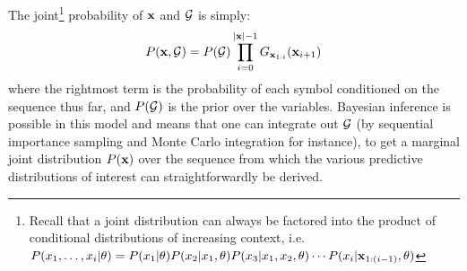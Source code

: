 \documentclass[12pt]{article}
\begin{document}
{{The joint\footnote{Recall that a joint distribution can always be factored into the product of conditional distributions of increasing context, i.e.~$P(x_1,\ldots,x_i|\theta) = P(x_1|\theta) P(x_2 | x_1, \theta) P(x_3 | x_1,x_2, \theta) \cdots P(x_i | \xbf_{1:(i-1)}, \theta)$} probability of $\xbf$ and $\GG$
is simply:
\begin{align}
P(\xbf,\GG) = P(\GG)\prod_{i=0}^{|\xbf|-1}G_{\xbf_{1:i}}(\xbf_{i+1})
\end{align}
where the rightmost term is the probability of each symbol conditioned on the sequence thus far, and $P(\GG)$ is the prior over the variables.  Bayesian inference is possible in this model and means that one can integrate out $\GG$ (by sequential importance sampling and Monte Carlo integration for instance), to get a marginal joint distribution $P(\xbf)$ over the sequence from which the various predictive distributions of interest can straightforwardly be derived.  

}}
\end{document}
